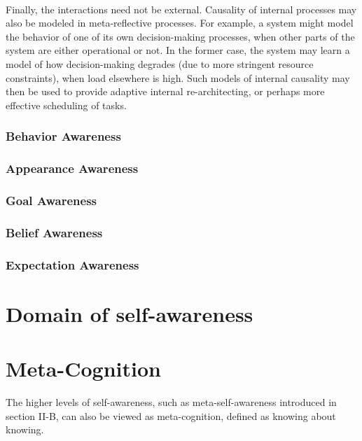 \documentclass{article}
\begin{document}
					\paragraph{} Finally, the interactions need not be external. Causality of internal processes may also be modeled in meta-reflective processes. For example, a system might model the behavior of one of its own decision-making processes, when other parts of the system are either operational or not. In the former case, the system may learn a model of how decision-making degrades (due to more stringent resource constraints), when load elsewhere is high. Such models of internal causality may then be used to provide adaptive internal re-architecting, or perhaps more effective scheduling of tasks.
					
				\subsubsection{Behavior Awareness}
				\subsubsection{Appearance Awareness}
				\subsubsection{Goal Awareness}
				\subsubsection{Belief Awareness}
				\subsubsection{Expectation Awareness}
		\section{Domain of self-awareness} \cite{lewis-2017-towards-a-framework-for-the-levels-and-aspects-of-self-aware-computing-systems}
		
		\section{Meta-Cognition}
			The higher levels of self-awareness, such as meta-self-awareness introduced in section \citet{lewis-2011-a-survey-of-self-awareness-and-its-application-in-computing-systems}II-B, can also be viewed as
			meta-cognition, defined \citet{overschelde-2008-metacognition-knowing-about-knowing} as knowing about knowing.
		
\end{document}
